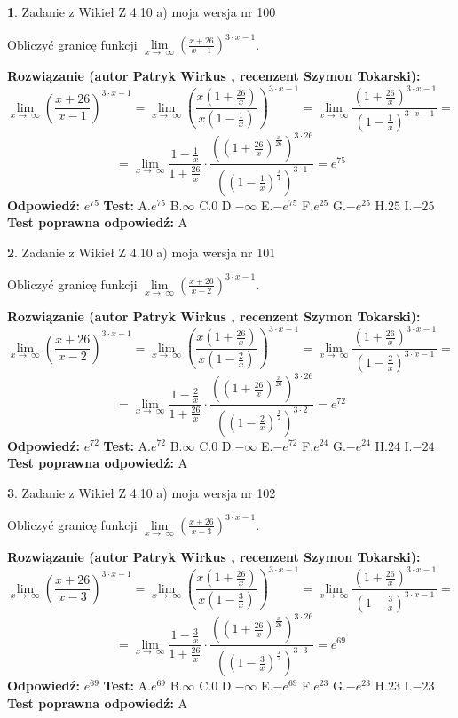 \documentclass[12pt, a4paper]{article}
\theoremstyle{definition} %
\newtheorem{zad}{}
\newcommand{\zadStart}[1]{\begin{zad}#1\newline}
\newcommand{\zadStop}{\end{zad}}
\newcommand{\rozwStart}[2]{\noindent \textbf{Rozwiązanie (autor #1 , recenzent #2): }\newline}
\newcommand{\rozwStop}{\newline}
\newcommand{\odpStart}{\noindent \textbf{Odpowiedź:}\newline}
\newcommand{\odpStop}{\newline}
\newcommand{\testStart}{\noindent \textbf{Test:}\newline}
\newcommand{\testStop}{\newline}
\newcommand{\kluczStart}{\noindent \textbf{Test poprawna odpowiedź:}\newline}
\newcommand{\kluczStop}{\newline}
\begin{document}
\zadStart{Zadanie z Wikieł Z 4.10 a) moja wersja nr 100}

Obliczyć granicę funkcji  $\lim\limits_{x\to\ \infty}(\frac{x+26}{x-1})^{3\cdot x-1}$.
\zadStop
\rozwStart{Patryk Wirkus}{Szymon Tokarski}
$$\lim\limits_{x\to\ \infty}(\frac{x+26}{x-1})^{3\cdot x-1} = \lim\limits_{x\to\ \infty}(\frac{x(1+\frac{26}{x})}{x(1-\frac{1}{x})})^{3\cdot x-1}=\lim\limits_{x\to\ \infty}\frac{(1+\frac{26}{x})^{3\cdot x-1}}{(1-\frac{1}{x})^{3\cdot x-1}}=$$
$$=\lim\limits_{x\to\ \infty}\frac{1-\frac{1}{x}}{1+\frac{26}{x}}\cdot\frac{((1+\frac{26}{x})^{\frac{x}{26}})^{3\cdot26}}{((1-\frac{1}{x})^{\frac{x}{1}})^{3\cdot1}}=e^{75}$$
\rozwStop
\odpStart
$e^{75}$
\odpStop
\testStart
A.$e^{75}$ B.$\infty$ C.$0$ D.$-\infty$ E.$-e^{75}$
F.$e^{25}$ G.$-e^{25}$
H.$25$
I.$-25$
\testStop
\kluczStart
A
\kluczStop



\zadStart{Zadanie z Wikieł Z 4.10 a) moja wersja nr 101}

Obliczyć granicę funkcji  $\lim\limits_{x\to\ \infty}(\frac{x+26}{x-2})^{3\cdot x-1}$.
\zadStop
\rozwStart{Patryk Wirkus}{Szymon Tokarski}
$$\lim\limits_{x\to\ \infty}(\frac{x+26}{x-2})^{3\cdot x-1} = \lim\limits_{x\to\ \infty}(\frac{x(1+\frac{26}{x})}{x(1-\frac{2}{x})})^{3\cdot x-1}=\lim\limits_{x\to\ \infty}\frac{(1+\frac{26}{x})^{3\cdot x-1}}{(1-\frac{2}{x})^{3\cdot x-1}}=$$
$$=\lim\limits_{x\to\ \infty}\frac{1-\frac{2}{x}}{1+\frac{26}{x}}\cdot\frac{((1+\frac{26}{x})^{\frac{x}{26}})^{3\cdot26}}{((1-\frac{2}{x})^{\frac{x}{2}})^{3\cdot2}}=e^{72}$$
\rozwStop
\odpStart
$e^{72}$
\odpStop
\testStart
A.$e^{72}$ B.$\infty$ C.$0$ D.$-\infty$ E.$-e^{72}$
F.$e^{24}$ G.$-e^{24}$
H.$24$
I.$-24$
\testStop
\kluczStart
A
\kluczStop



\zadStart{Zadanie z Wikieł Z 4.10 a) moja wersja nr 102}

Obliczyć granicę funkcji  $\lim\limits_{x\to\ \infty}(\frac{x+26}{x-3})^{3\cdot x-1}$.
\zadStop
\rozwStart{Patryk Wirkus}{Szymon Tokarski}
$$\lim\limits_{x\to\ \infty}(\frac{x+26}{x-3})^{3\cdot x-1} = \lim\limits_{x\to\ \infty}(\frac{x(1+\frac{26}{x})}{x(1-\frac{3}{x})})^{3\cdot x-1}=\lim\limits_{x\to\ \infty}\frac{(1+\frac{26}{x})^{3\cdot x-1}}{(1-\frac{3}{x})^{3\cdot x-1}}=$$
$$=\lim\limits_{x\to\ \infty}\frac{1-\frac{3}{x}}{1+\frac{26}{x}}\cdot\frac{((1+\frac{26}{x})^{\frac{x}{26}})^{3\cdot26}}{((1-\frac{3}{x})^{\frac{x}{3}})^{3\cdot3}}=e^{69}$$
\rozwStop
\odpStart
$e^{69}$
\odpStop
\testStart
A.$e^{69}$ B.$\infty$ C.$0$ D.$-\infty$ E.$-e^{69}$
F.$e^{23}$ G.$-e^{23}$
H.$23$
I.$-23$
\testStop
\kluczStart
A
\kluczStop
\end{document}
